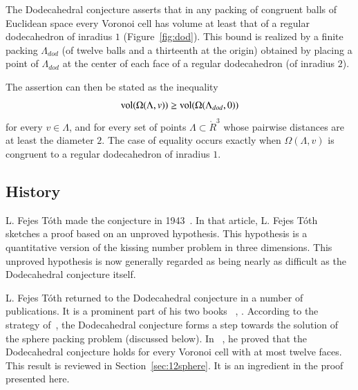 \documentclass{article} %
\begin{document}
The Dodecahedral conjecture asserts that in any packing of congruent balls of Euclidean
space every Voronoi cell has volume at least that of a regular dodecahedron
of inradius $1$ (Figure~\ref{fig:dod}).    This bound is realized by a finite 
packing $\Lambda_{dod}$
(of twelve balls and a thirteenth  at the origin) obtained
by placing a point of $\Lambda_{dod}$ at the center of each face of a regular dodecahedron (of inradius $2$).

The assertion can then be stated as the inequality
  $$
  {\operatorname{vol}}(\Omega(\Lambda,v)) \ge {\operatorname{vol}}(\Omega(\Lambda_{dod},0))
  $$
for every $v\in\Lambda$, and for every set of points $\Lambda\subset \ring{R}^3$
whose pairwise distances are at least the diameter $2$.
The case of equality occurs exactly when $\Omega(\Lambda,v)$ is
congruent to a regular dodecahedron of inradius $1$.

\subsection{History}

L. Fejes T\'oth made the conjecture in 1943~\cite{Toth:1943:MZ}.  
In that article, L. Fejes T\'oth sketches a proof based on an unproved
hypothesis. This hypothesis is a quantitative version of the kissing
number problem in three dimensions. This unproved hypothesis is now
generally regarded as being nearly as difficult as the Dodecahedral
conjecture itself.

L. Fejes T\'oth returned to the Dodecahedral conjecture in a number of
publications. It is a prominent part of his two books
~\cite{Toth:1972:Lagerungen}, \cite{Toth:1964:Regular}. According to
the strategy of~\cite{Toth:1972:Lagerungen}, the Dodecahedral
conjecture forms a step towards the solution of the sphere packing
problem (discussed below). In~\cite{Toth:1964:Regular} , he proved that the
Dodecahedral conjecture holds for every Voronoi cell with at most
twelve faces. This result is reviewed in Section~\ref{sec:12sphere}.
It is an ingredient in the proof presented here.
\end{document}
